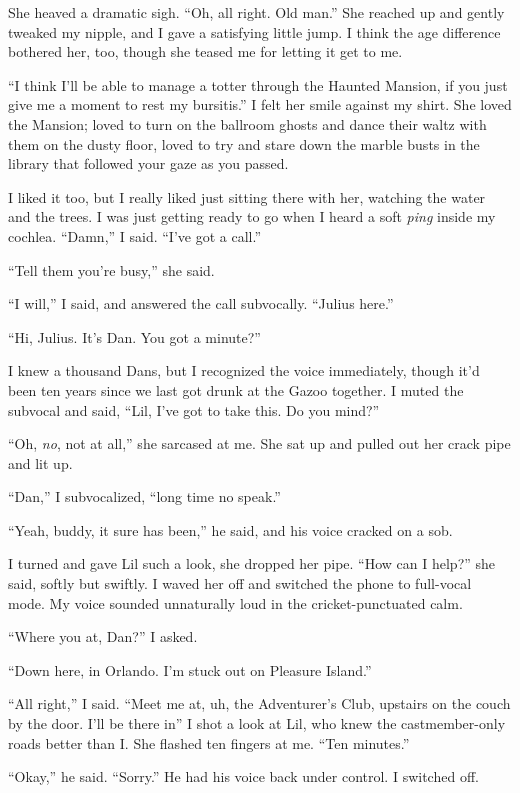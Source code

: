 She heaved a dramatic sigh. “Oh, all right. Old man.” She reached
up and gently tweaked my nipple, and I gave a satisfying little
jump. I think the age difference bothered her, too, though she
teased me for letting it get to me.

“I think I'll be able to manage a totter through the Haunted
Mansion, if you just give me a moment to rest my bursitis.” I felt
her smile against my shirt. She loved the Mansion; loved to turn on
the ballroom ghosts and dance their waltz with them on the dusty
floor, loved to try and stare down the marble busts in the library
that followed your gaze as you passed.

I liked it too, but I really liked just sitting there with her,
watching the water and the trees. I was just getting ready to go
when I heard a soft \emph{ping} inside my cochlea. “Damn,” I said.
“I've got a call.”

“Tell them you're busy,” she said.

“I will,” I said, and answered the call subvocally. “Julius here.”

“Hi, Julius. It's Dan. You got a minute?”

I knew a thousand Dans, but I recognized the voice immediately,
though it'd been ten years since we last got drunk at the Gazoo
together. I muted the subvocal and said, “Lil, I've got to take
this. Do you mind?”

“Oh, \emph{no}, not at all,” she sarcased at me. She sat up and
pulled out her crack pipe and lit up.

“Dan,” I subvocalized, “long time no speak.”

“Yeah, buddy, it sure has been,” he said, and his voice cracked on
a sob.

I turned and gave Lil such a look, she dropped her pipe. “How can I
help?” she said, softly but swiftly. I waved her off and switched
the phone to full-vocal mode. My voice sounded unnaturally loud in
the cricket-punctuated calm.

“Where you at, Dan?” I asked.

“Down here, in Orlando. I'm stuck out on Pleasure Island.”

“All right,” I said. “Meet me at, uh, the Adventurer's Club,
upstairs on the couch by the door. I'll be there in{\dash}” I shot a look
at Lil, who knew the castmember-only roads better than I. She
flashed ten fingers at me. “Ten minutes.”

“Okay,” he said. “Sorry.” He had his voice back under control. I
switched off.

